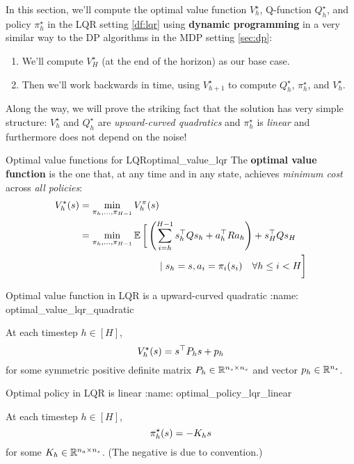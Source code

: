 \documentclass[\main/main]{subfiles}
\begin{document}
In this section, we'll compute the optimal value function $V^\star_h$, Q-function $Q^\star_h$, and policy $\pi^\star_h$ in the LQR setting \eqref{df:lqr} using \textbf{dynamic programming} in a very similar way to the DP algorithms in the MDP setting \eqref{sec:dp}:
\begin{enumerate}
    \item We'll compute $V_H^\star$ (at the end of the horizon) as our base case.
    \item Then we'll work backwards in time, using $V_{h+1}^\star$ to compute $Q_h^\star$, $\pi_{h}^\star$, and $V_h^\star$.
\end{enumerate}
Along the way, we will prove the striking fact that the solution has very simple structure: $V_h^\star$ and $Q^\star_h$ are \emph{upward-curved quadratics} and $\pi_h^\star$ is \emph{linear} and furthermore does not depend on the noise!

\begin{definition}[breakable=false]{Optimal value functions for LQR}{optimal_value_lqr}
    The \textbf{optimal value function} is the one that, at any time and in any state,
    achieves \emph{minimum cost} across \emph{all policies}: \[
        \begin{split}
            V^\star_h(s) &= \min_{\pi_h, \dots, \pi_{H-1}} V^\pi_h(s) \\
            &= \min_{\pi_{h}, \dots, \pi_{H-1}} \operatorname*{\mathbb{E}} \bigg[ \left( \sum_{i=h}^{H-1} s_h^\top Q s_h + a_h^\top R a_h \right) + s_H^\top Q s_H \\
                &\hspace{8em} \mid s_h = s, a_i = \pi_i(s_i) \quad \forall h \le i < H \bigg] \\
        \end{split}
    \]
\end{definition}

\begin{theorem}{Optimal value function in LQR is a upward-curved quadratic}
:name: optimal_value_lqr_quadratic

    At each timestep $h \in [H]$,
    \[
        V^\star_h(s) = s^\top P_h s + p_h
    \]
    for some symmetric positive definite matrix $P_h \in \mathbb{R}^{n_s \times n_s}$ and vector $p_h \in \mathbb{R}^{n_s}$.
\end{theorem}

\begin{theorem}{Optimal policy in LQR is linear}
:name: optimal_policy_lqr_linear

    At each timestep $h \in [H]$,
    \[
        \pi^\star_h (s) = - K_h s
    \]
    for some $K_h \in \mathbb{R}^{n_a \times n_s}$. (The negative is due to convention.)
\end{theorem}
\end{document}
